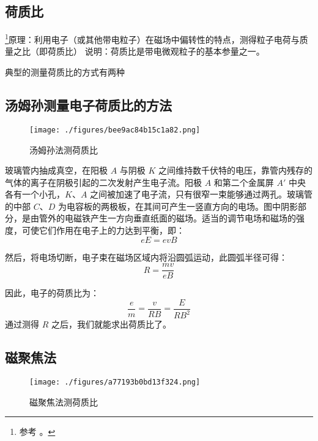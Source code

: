

\subsection{荷质比}
\footnote{参考 \cite{新电}。}原理：利用电子（或其他带电粒子）在磁场中偏转性的特点，测得粒子电荷与质量之比（即荷质比）
说明：荷质比是带电微观粒子的基本参量之一。

典型的测量荷质比的方式有两种

\subsection{汤姆孙测量电子荷质比的方法}

\begin{figure}[ht]
\centering
\texttt{[image: ./figures/bee9ac84b15c1a82.png]}
\caption{汤姆孙法测荷质比} \label{fig_Charge_1}
\end{figure}

玻璃管内抽成真空，在阳极 $A$ 与阴极 $K$ 之间维持数千伏特的电压，靠管内残存的气体的离子在阴极引起的二次发射产生电子流。阳极 $A$ 和第二个金属屏 $A'$ 中央各有一个小孔，$K$、$A$ 之间被加速了电子流，只有很窄一束能够通过两孔。玻璃管的中部 $C$、$D$ 为电容板的两极板，在其间可产生一竖直方向的电场。图中阴影部分，是由管外的电磁铁产生一方向垂直纸面的磁场。适当的调节电场和磁场的强度，可使它们作用在电子上的力达到平衡，即：
\begin{equation}
eE=evB
\end{equation}

然后，将电场切断，电子束在磁场区域内将沿圆弧运动，此圆弧半径可得：
\begin{equation}
R=\frac {mv}{eB}
\end{equation}

因此，电子的荷质比为：
\begin{equation}
\frac{e}{m}=\frac{v}{RB}=\frac {E}{RB^2}
\end{equation}
通过测得 $R$ 之后，我们就能求出荷质比了。

\subsection{磁聚焦法}

\begin{figure}[ht]
\centering
\texttt{[image: ./figures/a77193b0bd13f324.png]}
\caption{磁聚焦法测荷质比} \label{fig_Charge_2}
\end{figure}

